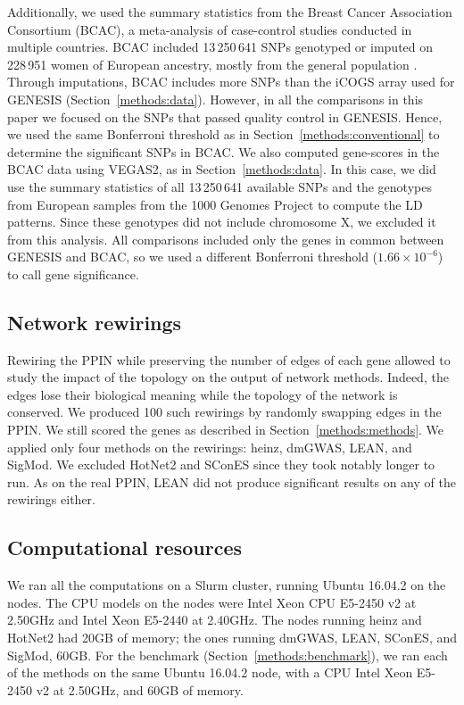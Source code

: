 \documentclass[10pt,letterpaper]{article}
\begin{document}
Additionally, we used the summary statistics from the Breast Cancer Association Consortium (BCAC), a meta-analysis of case-control studies conducted in multiple countries. BCAC included 13\,250\,641 SNPs genotyped or imputed on 228\,951 women of European ancestry, mostly from the general population \cite{Michailidou2017}. Through imputations, BCAC includes more SNPs than the iCOGS array used for GENESIS (Section~\ref{methods:data}). However, in all the comparisons in this paper we focused on the SNPs that passed quality control in GENESIS. Hence, we used the same Bonferroni threshold as in Section~\ref{methods:conventional} to determine the significant SNPs in BCAC. We also computed gene-scores in the BCAC data using VEGAS2, as in Section~\ref{methods:data}. In this case, we did use the summary statistics of all 13\,250\,641 available SNPs and the genotypes from European samples from the 1000 Genomes Project \cite{the_1000_genomes_project_consortium_global_2015} to compute the LD patterns. Since these genotypes did not include chromosome X, we excluded it from this analysis. All comparisons included only the genes in common between GENESIS and BCAC, so we used a different Bonferroni threshold ($1.66 \times 10^{-6}$) to call gene significance. 

\subsection{Network rewirings}
\label{methods:rewiring}

Rewiring the PPIN while preserving the number of edges of each gene allowed to study the impact of the topology on the output of network methods. Indeed, the edges lose their biological meaning while the topology of the network is conserved. We produced 100 such rewirings by randomly swapping edges in the PPIN. We still scored the genes as described in Section~\ref{methods:methods}. We applied only four methods on the rewirings: heinz, dmGWAS, LEAN, and SigMod. We excluded HotNet2 and SConES since they took notably longer to run. As on the real PPIN, LEAN did not produce significant results on any of the rewirings either.

\subsection{Computational resources}
\label{methods:computation}

We ran all the computations on a Slurm cluster, running Ubuntu 16.04.2 on the nodes. The CPU models on the nodes were Intel Xeon CPU E5-2450 v2 at 2.50GHz and Intel Xeon E5-2440 at 2.40GHz. The nodes running heinz and HotNet2 had 20GB of memory; the ones running dmGWAS, LEAN, SConES, and SigMod, 60GB. For the benchmark (Section~\ref{methods:benchmark}), we ran each of the methods on the same Ubuntu 16.04.2 node, with a CPU Intel Xeon E5-2450 v2 at 2.50GHz, and 60GB of memory.
\end{document}

